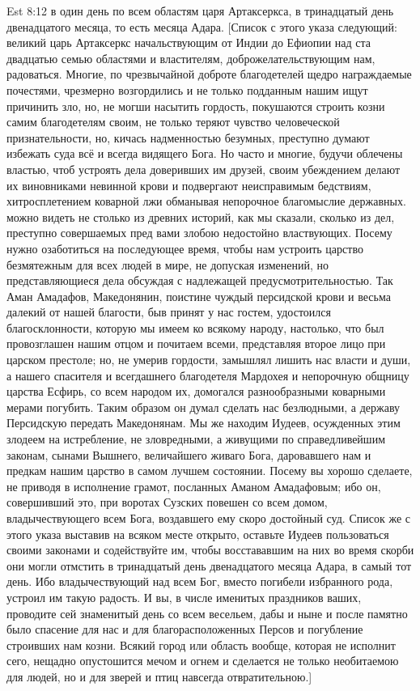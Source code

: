 \vs Est 8:12 в один день по всем областям царя Артаксеркса, в тринадцатый день двенадцатого месяца, то есть месяца Адара. [Список с этого указа следующий: великий царь Артаксеркс начальствующим от Индии до Ефиопии над ста двадцатью семью областями и властителям, доброжелательствующим нам, радоваться. Многие, по чрезвычайной доброте благодетелей щедро награждаемые почестями, чрезмерно возгордились и не только подданным нашим ищут причинить зло, но, не могши насытить гордость, покушаются строить козни самим благодетелям своим, не только теряют чувство человеческой признательности, но, кичась надменностью безумных, преступно думают избежать суда всё и всегда видящего Бога. Но часто и многие, будучи облечены властью, чтоб устроять дела доверивших им друзей, своим убеждением делают их виновниками  невинной крови и подвергают неисправимым бедствиям, хитросплетением коварной лжи обманывая непорочное благомыслие державных.  можно видеть не столько из древних историй, как мы сказали, сколько из дел, преступно совершаемых пред вами злобою недостойно властвующих. Посему нужно озаботиться на последующее время, чтобы нам устроить царство безмятежным для всех людей в мире, не допуская изменений, но представляющиеся дела обсуждая с надлежащей предусмотрительностью. Так Аман Амадафов, Македонянин, поистине чуждый персидской крови и весьма далекий от нашей благости, быв принят у нас гостем, удостоился благосклонности, которую мы имеем ко всякому народу, настолько, что был провозглашен нашим отцом и почитаем всеми, представляя второе лицо при царском престоле; но, не умерив гордости, замышлял лишить нас власти и души, а нашего спасителя и всегдашнего благодетеля Мардохея и непорочную общницу царства Есфирь, со всем народом их, домогался разнообразными коварными мерами погубить. Таким образом он думал сделать нас безлюдными, а державу Персидскую передать Македонянам. Мы же находим Иудеев, осужденных этим злодеем на истребление, не зловредными, а живущими по справедливейшим законам, сынами Вышнего, величайшего живаго Бога, даровавшего нам и предкам нашим царство в самом лучшем состоянии. Посему вы хорошо сделаете, не приводя в исполнение грамот, посланных Аманом Амадафовым; ибо он, совершивший это, при воротах Сузских повешен со всем домом,  владычествующего всем Бога, воздавшего ему скоро достойный суд. Список же с этого указа выставив на всяком месте открыто, оставьте Иудеев пользоваться своими законами и содействуйте им, чтобы восстававшим на них во время скорби они могли отмстить в тринадцатый день двенадцатого месяца Адара, в самый тот день. Ибо владычествующий над всем Бог, вместо погибели избранного рода, устроил им такую радость. И вы, в числе именитых праздников ваших, проводите сей знаменитый день со всем весельем, дабы и ныне и после памятно было спасение для нас и для благорасположенных  Персов и погубление строивших нам козни. Всякий город или область вообще, которая не исполнит сего, нещадно опустошится мечом и огнем и сделается не только необитаемою для людей, но и для зверей и птиц навсегда отвратительною.]
